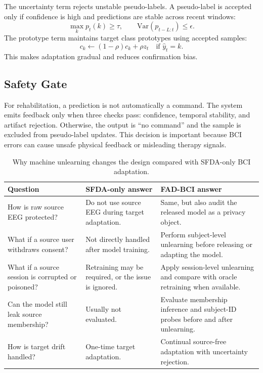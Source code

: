 \documentclass[10pt,twocolumn]{article}
\begin{document}
The uncertainty term rejects unstable pseudo-labels. A pseudo-label is accepted only if confidence is high and predictions are stable across recent windows:
\begin{equation}
\max_k p_t(k)\geq \tau,\qquad
\mathrm{Var}(p_{t-L:t})\leq \epsilon.
\end{equation}
The prototype term maintains target class prototypes using accepted samples:
\begin{equation}
c_k \leftarrow (1-\rho)c_k+\rho z_t
\quad \text{if } \hat{y}_t=k.
\end{equation}
This makes adaptation gradual and reduces confirmation bias.

\subsection{Safety Gate}
For rehabilitation, a prediction is not automatically a command. The system emits feedback only when three checks pass: confidence, temporal stability, and artifact rejection. Otherwise, the output is ``no command'' and the sample is excluded from pseudo-label updates. This decision is important because BCI errors can cause unsafe physical feedback or misleading therapy signals.

\begin{table}[t]
\centering
\caption{Why machine unlearning changes the design compared with SFDA-only BCI adaptation.}
\label{tab:logic}
\begin{tabular}{p{} p{} p{}}
\toprule
\textbf{Question} & \textbf{SFDA-only answer} & \textbf{FAD-BCI answer} \\
\midrule
How is raw source EEG protected? & Do not use source EEG during target adaptation. & Same, but also audit the released model as a privacy object. \\
What if a source user withdraws consent? & Not directly handled after model training. & Perform subject-level unlearning before releasing or adapting the model. \\
What if a source session is corrupted or poisoned? & Retraining may be required, or the issue is ignored. & Apply session-level unlearning and compare with oracle retraining when available. \\
Can the model still leak source membership? & Usually not evaluated. & Evaluate membership inference and subject-ID probes before and after unlearning. \\
How is target drift handled? & One-time target adaptation. & Continual source-free adaptation with uncertainty rejection. \\
\bottomrule
\end{tabular}
\end{table}
\end{document}
